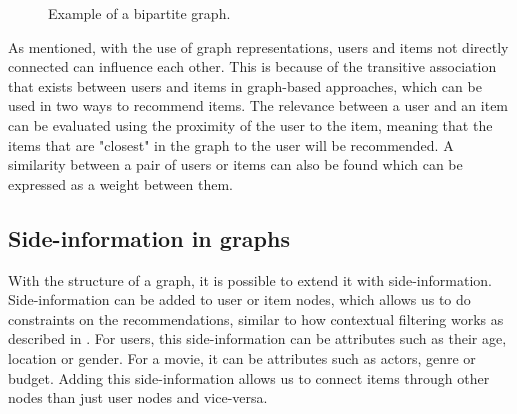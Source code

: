 \begin{figure}[h]
\caption{Example of a bipartite graph.}
\label{fig:bipartite-graph}
\end{figure}
As mentioned, with the use of graph representations, users and items not directly connected can influence each other.
This is because of the transitive association that exists between users and items in graph-based approaches, which can be used in two ways to recommend items.
The relevance between a user and an item can be evaluated using the proximity of the user to the item, meaning that the items that are "closest" in the graph to the user will be recommended.
A similarity between a pair of users or items can also be found which can be expressed as a weight between them\cite{RecommenderHandbook2015}.

\subsection{Side-information in graphs}
With the structure of a graph, it is possible to extend it with side-information.
Side-information can be added to user or item nodes, which allows us to do constraints on the recommendations, similar to how contextual filtering works as described in .
For users, this side-information can be attributes such as their age, location or gender.
For a movie, it can be attributes such as actors, genre or budget.
Adding this side-information allows us to connect items through other nodes than just user nodes and vice-versa.

